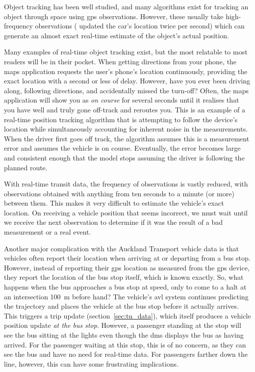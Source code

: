 Object tracking has been well studied, and many algorithms exist for tracking an object through space using \gls{gps} observations. However, these usually take high-frequency observations (\citet{Gustafsson_2002} updated the car's location twice per second) which can generate an almost exact real-time estimate of the object's actual position.


Many examples of real-time object tracking exist, but the most relatable to most readers will be in their pocket. When getting directions from your phone, the maps application requests the user's phone's location continuously, providing the exact location with a second or less of delay. However, have you ever been driving along, following directions, and accidentally missed the turn-off? Often, the maps application will show you as \emph{on course} for several seconds until it realises that you have well and truly gone off-track and reroutes you. This is an example of a real-time position tracking algorithm that is attempting to follow the device's location while simultaneously accounting for inherent noise in the measurements. When the driver first goes off track, the algorithm assumes this is a measurement error and assumes the vehicle is on course. Eventually, the error becomes large and consistent enough that the model stops assuming the driver is following the planned route.


With real-time transit data, the frequency of observations is vastly reduced, with observations obtained with anything from ten seconds to a minute (or more) between them. This makes it very difficult to estimate the vehicle's exact location. On receiving a vehicle position that seems incorrect, we must wait until we receive the next observation to determine if it was the result of a bad measurement or a real event.


Another major complication with the Auckland Transport vehicle data is that vehicles often report their location when arriving at or departing from a bus stop. However, instead of reporting their \gls{gps} location as measured from the \gls{gps} device, they report the location of the bus stop itself, which is known exactly. So, what happens when the bus approaches a bus stop at speed, only to come to a halt at an intersection 100~m before hand? The vehicle's \gls{avl} system continues predicting the trajectory and places the vehicle at the bus stop before it actually arrives. This triggers a trip update (section~\ref{sec:tu_data}), which itself produces a vehicle position update \emph{at the bus stop}. However, a passenger standing at the stop will see the bus sitting at the lights even though the \gls{dms} displays the bus as having arrived. For the passenger waiting at this stop, this is of no concern, as they can see the bus and have no need for real-time data. For passengers farther down the line, however, this can have some frustrating implications.

